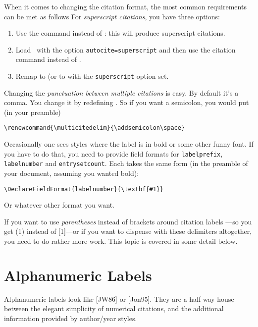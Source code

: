 When it comes to changing the citation format, the most common
requirements can be met as follows For \emph{superscript citations},
you have three options:
\begin{enumerate}
\item Use the 
  command instead of : this will produce
  superscript citations.
\item Load \biblatex\ with the option \verb|autocite=superscript| and
  then use the  citation command instead of .
\item Remap  to  (or to  with the
  \verb|superscript| option set.
\end{enumerate}

Changing the \emph{punctuation between multiple citations} is easy. By
default it's a comma. You change it by redefining
. So
if you want a semicolon, you would put (in your preamble)
\begin{center}
\verb|\renewcommand{\multicitedelim}{\addsemicolon\space}|
\end{center}

Occasionally one sees styles where the label is in
bold or some other
funny font. If you have to do that, you need to provide field formats
for \verb|labelprefix|, \verb|labelnumber| and
\verb|entrysetcount|. Each takes the same form (in the preamble of
your document, assuming you wanted bold):
\begin{center}
\verb|\DeclareFieldFormat{labelnumber}{\textbf{#1}}|
\end{center}
Or whatever other format you want.


If you want to use \emph{parentheses} instead of brackets around
citation labels ---so you get (1) instead of [1]---or if you want to
dispense with these delimiters altogether, you need to do rather more
work. This topic is covered in some detail below.

\section{Alphanumeric Labels}

Alphanumeric labels look like [JW86] or [Jon95]. They are a half-way
house between the elegant simplicity of numerical citations, and the
additional information provided by author/year styles.

